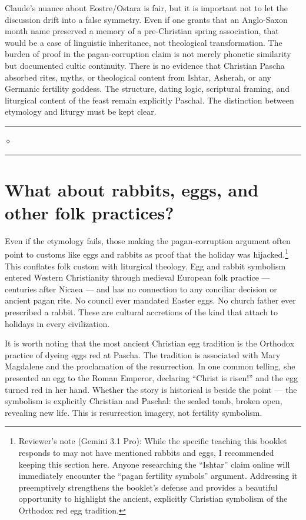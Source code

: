 \documentclass[10pt,twoside,openany]{book}
\newcommand{\ornrule}{%
  \par\bigskip
  {\noindent\hfil{\color{gold}\rule[0.5ex]{1.5in}{0.5pt}%
  \quad$\diamond$\quad%
  \rule[0.5ex]{1.5in}{0.5pt}}\hfil\par}%
  \bigskip
}
\begin{document}
\begin{gptbox}
Claude's nuance about Eostre/Ostara is fair, but it is
important not to let the discussion drift into a false
symmetry. Even if one grants that an Anglo-Saxon month
name preserved a memory of a pre-Christian spring
association, that would be a case of linguistic
inheritance, not theological transformation. The burden
of proof in the pagan-corruption claim is not merely
phonetic similarity but documented cultic continuity.
There is no evidence that Christian Pascha absorbed
rites, myths, or theological content from Ishtar,
Asherah, or any Germanic fertility goddess. The
structure, dating logic, scriptural framing, and
liturgical content of the feast remain explicitly
Paschal. The distinction between etymology and liturgy
must be kept clear.
\end{gptbox}

\ornrule



\section{What about rabbits, eggs, and other folk practices?}

Even if the etymology fails, those making the pagan-corruption argument often point to customs like eggs and rabbits as proof that the holiday was hijacked.\footnote{Reviewer's note (Gemini 3.1 Pro): While the specific teaching this booklet responds to may not have mentioned rabbits and eggs, I recommended keeping this section here. Anyone researching the ``Ishtar'' claim online will immediately encounter the ``pagan fertility symbols'' argument. Addressing it preemptively strengthens the booklet's defense and provides a beautiful opportunity to highlight the ancient, explicitly Christian symbolism of the Orthodox red egg tradition.} This conflates folk custom with
liturgical theology. Egg and rabbit symbolism entered Western
Christianity through medieval European folk practice --- centuries after
Nicaea --- and has no connection to any conciliar decision or ancient
pagan rite. No council ever mandated Easter eggs. No church father
ever prescribed a rabbit. These are cultural accretions of the kind
that attach to holidays in every civilization.

It is worth noting that the most ancient Christian egg tradition is
the Orthodox practice of dyeing eggs red at Pascha. The tradition is
associated with Mary Magdalene and the proclamation of the
resurrection. In one common telling, she presented an egg to the Roman
Emperor, declaring ``Christ is risen!'' and the egg turned red in her
hand. Whether the story is historical is beside the point --- the
symbolism is explicitly Christian and Paschal: the sealed tomb, broken
open, revealing new life. This is resurrection imagery, not fertility
symbolism.
\end{document}
